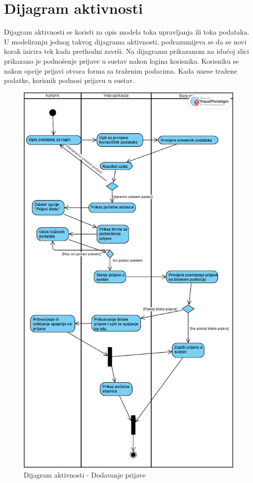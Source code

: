 		\section{Dijagram aktivnosti}
			
			Dijagram aktivnosti se koristi za opis modela toka upravljanja ili toka podataka. U modeliranju jednog takvog dijagrama aktivnosti, podrazumijeva se da se novi korak inicira tek kada prethodni završi. Na dijagramu prikazanom na idućoj slici prikazano je podnošenje prijave u sustav nakon logina korisnika. Korisniku se nakon opcije prijavi otvara forma sa traženim podacima. Kada unese tražene podatke, korisnik podnosi prijavu u sustav.
			
			
			\begin{figure}[H]
			\includegraphics[scale=0.4]{slike/ActivityDiagram.PNG} %
			\centering
			\caption{Dijagram aktivnosti - Dodavanje prijave}
			\label{fig:bazapod}
		\end{figure}
			
